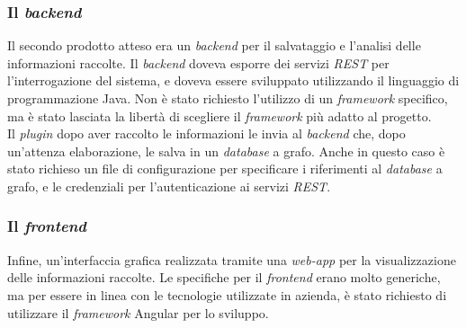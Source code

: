 \subsubsection*{Il \textit{backend}}
Il secondo prodotto atteso era un \textit{backend} per il salvataggio e l'analisi delle informazioni raccolte. 
Il \textit{backend} doveva esporre dei servizi \textit{REST} per l'interrogazione del sistema, e doveva essere sviluppato utilizzando
il linguaggio di programmazione Java. Non è stato richiesto l'utilizzo di un \textit{framework} specifico, ma è stato lasciata
la libertà di scegliere il \textit{framework} più adatto al progetto.\\
Il \textit{plugin} dopo aver raccolto le informazioni le invia al \textit{backend} che, dopo un'attenza elaborazione, le salva in un \textit{database} a grafo.
Anche in questo caso è stato richieso un file di configurazione per specificare i riferimenti al \textit{database} a grafo, e le credenziali
per l'autenticazione ai servizi \textit{REST}.\\

\subsubsection*{Il \textit{frontend}}
Infine, un'interfaccia grafica realizzata tramite una \textit{web-app} per la visualizzazione delle informazioni raccolte.
Le specifiche per il \textit{frontend} erano molto generiche, ma per essere in linea con le tecnologie utilizzate in azienda,
è stato richiesto di utilizzare il \textit{framework} Angular per lo sviluppo.\\
